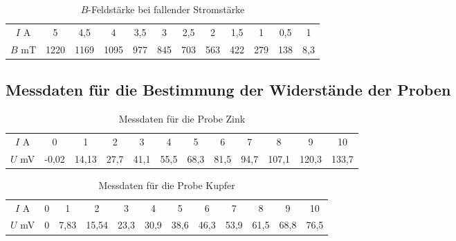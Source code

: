 \begin{table}
 \centering
 \begin{tabular}[width=\textwidth]{S| S[table-format=4.0] S[table-format=4.1] S[table-format=4.0] S[table-format=3.1] S[table-format=3.0] S[table-format=3.1] S[table-format=3.0] S[table-format=3.1] S[table-format=3.0] S[table-format=3.1] S[table-format=3.1]}

     \midrule
      $I$  \si{\ampere} & 5 & 4,5 & 4 & 3,5 & 3 & 2,5 & 2 & 1,5 & 1 & 0,5 & 1 \\
      $B$  \si{\milli\tesla} & 1220 & 1169 & 1095 & 977 & 845 & 703 & 563 & 422 & 279 & 138 & 8,3 \\
      \bottomrule
\end{tabular}
  \caption{$B$-Feldstärke bei fallender Stromstärke}
  \label{tab:Messergebnisse_Feldstärke_Ifällt}
\end{table}

\newpage

\subsection{Messdaten für die Bestimmung der Widerstände der Proben}

\begin{table}
 \centering
 \begin{tabular}[width=\textwidth]{S| S[table-format=2.2] S[table-format=2.2] S[table-format=2.1] S[table-format=2.1] S[table-format=2.1] S[table-format=2.1] S[table-format=2.1] S[table-format=2.1] S[table-format=3.1] S[table-format=3.1] S[table-format=3.1]}

     \midrule
      $I$  \si{\ampere} & 0 & 1 & 2 & 3 & 4 & 5 & 6 & 7 & 8 & 9 & 10 \\
      $U$  \si{\milli\volt} & -0,02 & 14,13 & 27,7 & 41,1 & 55,5 & 68,3 & 81,5 & 94,7 & 107,1 & 120,3 & 133,7 \\
      \bottomrule
\end{tabular}
  \caption{Messdaten für die Probe Zink}
  \label{tab:Spannung_Zink}
\end{table}


\begin{table}
 \centering
 \begin{tabular}[width=\textwidth]{S| S[table-format=1.2] S[table-format=2.2] S[table-format=2.1] S[table-format=2.1] S[table-format=2.1] S[table-format=2.1] S[table-format=2.1] S[table-format=2.1] S[table-format=3.1] S[table-format=3.1] S[table-format=3.1]}

     \midrule
      $I$  \si{\ampere} & 0 & 1 & 2 & 3 & 4 & 5 & 6 & 7 & 8 & 9 & 10 \\
      $U$  \si{\milli\volt} & 0 & 7,83 & 15,54 & 23,3 & 30,9 & 38,6 & 46,3 & 53,9 & 61,5 & 68,8 & 76,5\\
      \bottomrule
\end{tabular}
  \caption{Messdaten für die Probe Kupfer}
  \label{tab:Spannung_Kupfer}
\end{table}


